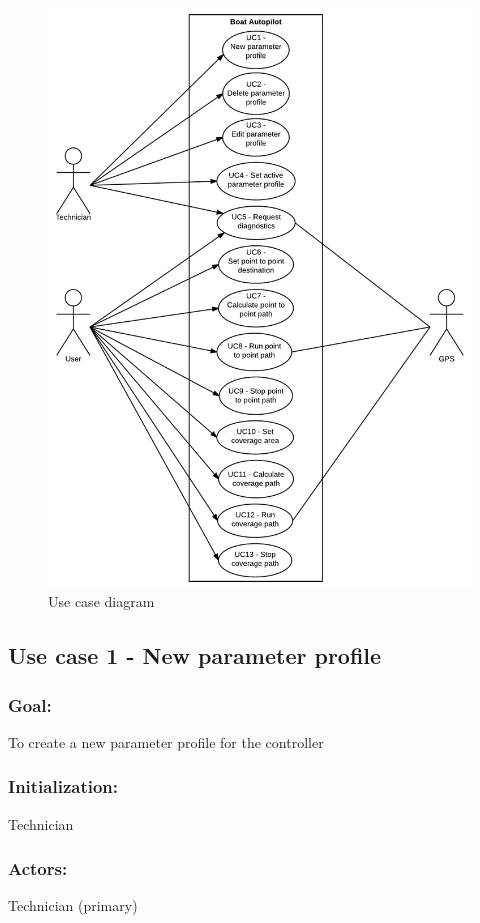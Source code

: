 \begin{figure}[H]
	\centering
	\includegraphics[width=0.9\linewidth]{Images/Requirements_specification/Usecase_diagram}
	\caption{Use case diagram}
	\label{fig:usecasediagram}
\end{figure}


\subsection{Use case 1 - New parameter profile}
\subsubsection*{Goal:}
To create a new parameter profile for the controller

\subsubsection*{Initialization:}
Technician

\subsubsection*{Actors:}
Technician (primary)

